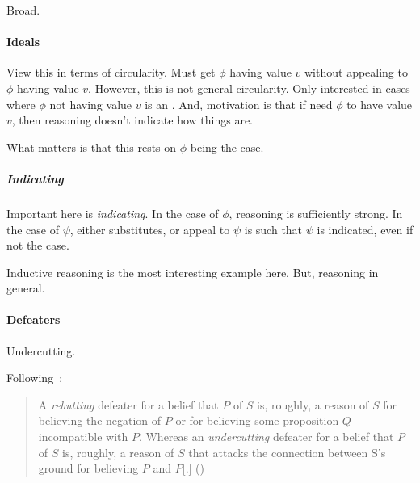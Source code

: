 \begin{note}
  Broad.
\end{note}

\paragraph{Ideals}

\begin{note}[Circularity?]
  View this in terms of circularity.
  Must get \(\phi\) having value \(v\) without appealing to \(\phi\) having value \(v\).
  However, this is not general circularity.
  Only interested in cases where \(\phi\) not having value \(v\) is an \epAdv{}.
  And, motivation is that if need \(\phi\) to have value \(v\), then reasoning doesn't indicate how things are.

  What matters is that this rests on \(\phi\) being the case.
\end{note}


\subparagraph{Indicating}

\begin{note}
  Important here is \emph{indicating}.
  In the case of \(\phi\), reasoning is sufficiently strong.
  In the case of \(\psi\), either substitutes, or appeal to \(\psi\) is such that \(\psi\) is indicated, even if not the case.

  Inductive reasoning is the most interesting example here.
  But, reasoning in general.
\end{note}

\paragraph{Defeaters}

\begin{note}
  Undercutting.

  Following~\citeauthor{Moretti:2018va}:
  \begin{quote}
    A \emph{rebutting} defeater for a belief that \(P\) of \(S\) is, roughly, a reason of \(S\) for believing the negation of \(P\) or for believing some proposition \(Q\) incompatible with \(P\).
    Whereas an \emph{undercutting} defeater for a belief that \(P\) of \(S\) is, roughly, a reason of \(S\) that attacks the connection between S's ground for believing \(P\) and \(P\)[.]\nolinebreak
    \mbox{}\hfill\mbox{(\citeyear{Moretti:2018va})}
  \end{quote}
\end{note}

